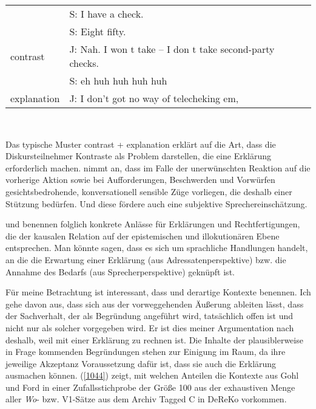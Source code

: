 {\begin{exe}
	\ex\label{1043} 
    \begin{tabular}[t]{ll}
	& S: I have a check.\\
	& S: Eight fifty.\\
	contrast & J: Nah. I won t take – I don t take second-party checks.\\
	& S: eh huh huh huh huh\\
	explanation & J: I don't got no way of telecheking  em,						 
    \end{tabular} \\
    \hbox{}\hfill\hbox{\citet[294]{Ford2000}} 
\end{exe}	
Das typische Muster contrast + explanation erklärt \citet[289]{Ford2000} auf die Art, dass die Diskursteilnehmer Kontraste als Problem darstellen, die eine Erklärung erforderlich machen. \citet[103]{Gohl2000} nimmt an, dass im Falle der uner\-wünschten Reaktion auf die vorherige Aktion sowie bei Aufforderungen, Be\-schwerden und Vorwürfen gesichtsbedrohende, konversationell sensible Züge vorliegen, die deshalb einer Stützung bedürfen. Und diese fördere auch eine subjektive Sprechereinschätzung.

\citet{Gohl2000} und \citet{Ford2000} benennen folglich konkrete Anlässe für Erklärungen und Rechtfertigungen, die der kausalen Relation auf der epistemischen und illokutionären  Ebene  entsprechen. Man könnte sagen, dass es sich um sprachliche Handlungen handelt, an die die Erwartung einer Erklärung (aus Adressaten\-perspektive) bzw. die Annahme des Bedarfs (aus Sprecherperspektive) geknüpft ist.

Für meine Betrachtung ist interessant, dass \citet{Ford1993, Ford2000} und \citet{Gohl2000} derartige Kontexte benennen. Ich gehe davon aus, dass sich aus der vorweggehenden Äußerung ableiten lässt, dass der Sachverhalt, der als Begründung angeführt wird, tatsächlich offen ist und nicht nur als solcher vorgegeben wird. Er ist dies meiner Argumentation nach deshalb, weil mit einer Erklärung zu rechnen ist. Die Inhalte der plausiblerweise in Frage kommenden Begründungen stehen zur Einigung im Raum, da ihre jeweilige Akzeptanz Voraussetzung dafür ist, dass sie auch die Erklärung ausmachen können. (\ref{1044}) zeigt, mit welchen Anteilen die Kontexte aus Gohl und Ford in einer Zufallsstichprobe der Größe 100 aus der exhaustiven Menge aller \textit{Wo}- bzw. V1-Sätze aus dem Archiv Tagged C in DeReKo vorkommen.

}
